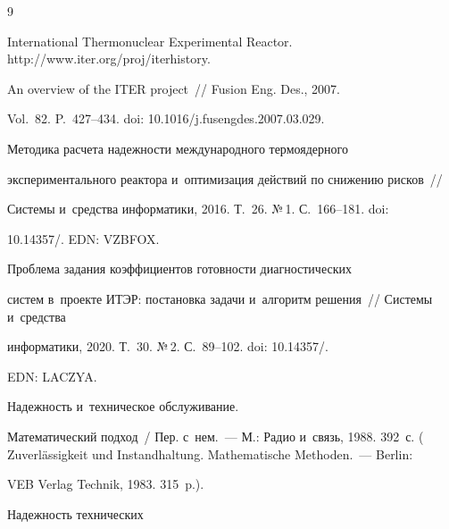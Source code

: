 {\small\frenchspacing


{%




\begin{thebibliography}{9}




International Thermonuclear Experimental Reactor. {\sf http://www.iter.org/proj/\linebreak iterhistory}.




 An overview of the ITER project~/\!\!/ Fusion Eng. Des., 2007. 


Vol.~82. P.~427--434. doi: 10.1016\!/\!j.fusengdes.2007.03.029.




 Методика расчета надежности международного термоядерного 


экспериментального реактора и~оптимизация действий по снижению рисков~/\!\!/  


Сис\-те\-мы и~средства информатики, 2016. Т.~26. №\,1. С.~166--181. doi: 


10.14357\!/. EDN: VZBFOX.




 Проблема задания коэффициентов готовности диагностических 


сис\-тем в~проекте ИТЭР: постановка задачи и~алгоритм решения~/\!\!/ Системы и~средства 


информатики, 2020. Т.~30. №\,2. С.~89--102. doi: 10.14357\!/. 


EDN: LACZYA.







 Надежность и~техническое обслуживание. 


Математический подход~/ Пер. с~нем.~--- М.: Радио и~связь, 1988. 392~с. ( Zuverl\"{a}ssigkeit und Instandhaltung. Mathematische Methoden.~--- Berlin: 


VEB Verlag Technik, 1983. 315~p.).




 Надежность технических 



\end{thebibliography}}}
